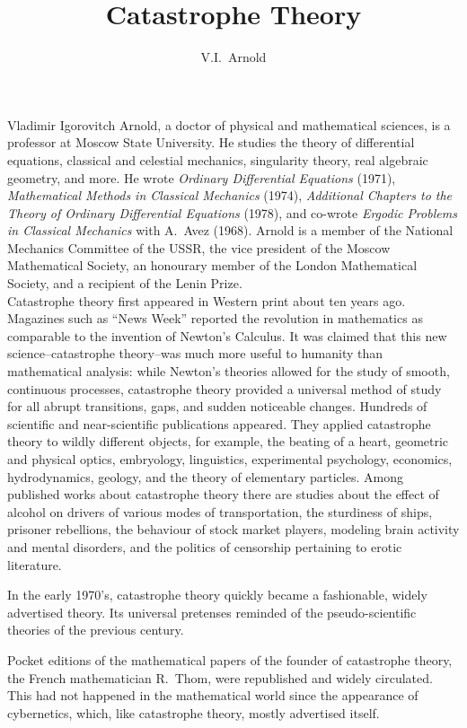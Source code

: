 \documentclass[12pt]{amsart}
\title{Catastrophe Theory}
\author{V.I.\ Arnold}
\begin{document}
\maketitle
{\fontsize{9pt}{1em}\selectfont
Vladimir Igorovitch Arnold, a doctor of physical and mathematical sciences, is a
professor at Moscow State University.
He studies the theory of differential equations, classical and celestial
mechanics, singularity theory, real algebraic geometry, and more.
He wrote \textit{Ordinary Differential Equations} (1971), \textit{Mathematical
Methods in Classical Mechanics} (1974), \textit{Additional Chapters to the
Theory of Ordinary Differential Equations} (1978), and co-wrote \textit{Ergodic
Problems in Classical Mechanics} with A.\ Avez (1968).
Arnold is a member of the National Mechanics Committee of the USSR, the vice
president of the Moscow Mathematical Society, an honourary member of the London
Mathematical Society, and a recipient of the Lenin Prize.}\\

Catastrophe theory first appeared in Western print about ten years ago.
Magazines such as ``News Week'' reported the revolution in mathematics as
comparable to the invention of Newton's Calculus.
It was claimed that this new science--catastrophe theory--was much more
useful to humanity than mathematical analysis: while Newton's theories allowed
for the study of smooth, continuous processes, catastrophe theory provided a
universal method of study for all abrupt transitions, gaps, and sudden
noticeable changes.
Hundreds of scientific and near-scientific publications appeared.
They applied catastrophe theory to wildly different objects, for example, the
beating of a heart, geometric and physical optics, embryology, linguistics,
experimental psychology, economics, hydrodynamics, geology, and the theory of
elementary particles.
Among published works about catastrophe theory there are studies about the
effect of alcohol on drivers of various modes of transportation, the sturdiness
of ships, prisoner rebellions, the behaviour of stock market players, modeling
brain activity and mental disorders, and the politics of censorship pertaining
to erotic literature.

In the early 1970's, catastrophe theory quickly became a fashionable, widely
advertised theory.
Its universal pretenses reminded of the pseudo-scientific theories of the
previous century.

Pocket editions of the mathematical papers of the founder of catastrophe theory,
the French mathematician R.\ Thom, were republished and widely circulated.
This had not happened in the mathematical world since the appearance of
cybernetics, which, like catastrophe theory, mostly advertised itself.
\end{document}
